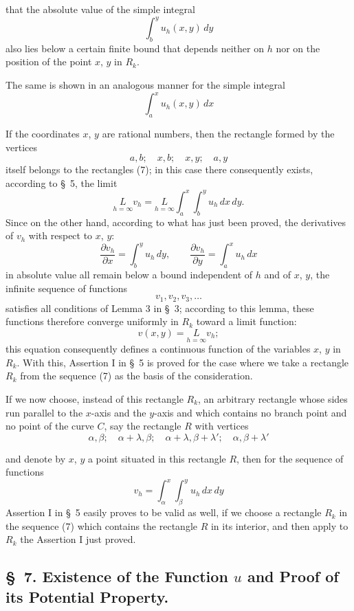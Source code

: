 \documentclass{article}
\begin{document}
that the absolute value of the simple integral
\[
\int_b^y u_h(x, y)\,dy
\]
also lies below a certain finite bound that depends neither on $h$ nor on the position of the point $x$, $y$ in $R_k$.

The same is shown in an analogous manner for the simple integral
\[
\int_a^x u_h(x, y)\,dx
\]

If the coordinates $x$, $y$ are rational numbers, then the rectangle formed by the vertices
\[
a, b; \quad x, b; \quad x, y; \quad a, y
\]
itself belongs to the rectangles (7); in this case there consequently exists, according to §~5, the limit
\[
\underset{h=\infty}{L} v_h = \underset{h=\infty}{L} \int_a^x \int_b^y u_h\,dx\,dy.
\]
Since on the other hand, according to what has just been proved, the derivatives of $v_h$ with respect to $x$, $y$:
\[
\frac{\partial v_h}{\partial x} = \int_b^y u_h\,dy, \qquad \frac{\partial v_h}{\partial y} = \int_a^x u_h\,dx
\]
in absolute value all remain below a bound independent of $h$ and of $x$, $y$, the infinite sequence of functions
\[
v_1, v_2, v_3, \dots
\]
satisfies all conditions of Lemma 3 in §~3; according to this lemma, these functions therefore converge uniformly in $R_k$ toward a limit function:
\[
v(x, y) = \underset{h=\infty}{L} v_h;
\]
this equation consequently defines a continuous function of the variables $x$, $y$ in $R_k$. With this, Assertion I in §~5 is proved for the case where we take a rectangle $R_k$ from the sequence (7) as the basis of the consideration.

If we now choose, instead of this rectangle $R_k$, an arbitrary rectangle whose sides run parallel to the $x$-axis and the $y$-axis and which contains no branch point and no point of the curve $C$, say the rectangle $R$ with vertices
\[
\alpha, \beta; \quad \alpha+\lambda, \beta; \quad \alpha+\lambda, \beta+\lambda'; \quad \alpha, \beta+\lambda'
\]

and denote by $x$, $y$ a point situated in this rectangle $R$, then for the sequence of functions
\[
v_h = \int_\alpha^x \int_\beta^y u_h\,dx\,dy
\]
Assertion I in §~5 easily proves to be valid as well, if we choose a rectangle $R_k$ in the sequence (7) which contains the rectangle $R$ in its interior, and then apply to $R_k$ the Assertion I just proved.

\subsection*{§~7. Existence of the Function $u$ and Proof of its Potential Property.}
\end{document}
